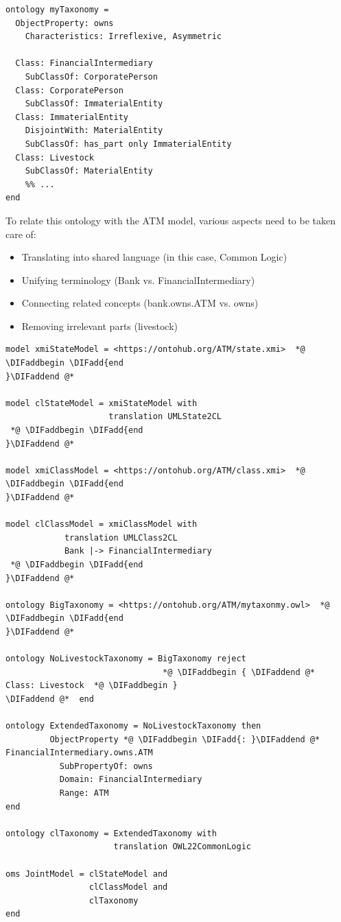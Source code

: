 \documentclass[10pt,fleqn,final]{scrreprt}
\providecommand{\DIFadd}[1]{{\protect\color{blue}\uwave{#1}}} %
\providecommand{\DIFaddbegin}{} %
\providecommand{\DIFaddend}{} %
\begin{document}
\begin{lstlisting}[basicstyle=\ttfamily,language=dolText,alsolanguage=owl2Manchester,escapechar=@,mathescape]
ontology myTaxonomy =
  ObjectProperty: owns
    Characteristics: Irreflexive, Asymmetric

  Class: FinancialIntermediary
    SubClassOf: CorporatePerson
  Class: CorporatePerson
    SubClassOf: ImmaterialEntity
  Class: ImmaterialEntity
    DisjointWith: MaterialEntity
    SubClassOf: has_part only ImmaterialEntity
  Class: Livestock
    SubClassOf: MaterialEntity
    %% ...
end
\end{lstlisting}

 To relate this ontology with the ATM model, 
various aspects need to be taken care of:
\begin{itemize}
  \item Translating into shared language  (in this case, Common Logic)
  \item Unifying terminology (Bank vs. FinancialIntermediary)
  \item Connecting related concepts (bank.owns.ATM vs. owns)
  \item Removing irrelevant parts (livestock) 
\end{itemize}

\begin{lstlisting}[basicstyle=\ttfamily\small,language=dolText,alsolanguage=owl2Manchester,escapechar=@,mathescape]
  model xmiStateModel = <https://ontohub.org/ATM/state.xmi>  *@ \DIFaddbegin \DIFadd{end
}\DIFaddend @*  

model clStateModel = xmiStateModel with
                     translation UMLState2CL
 *@ \DIFaddbegin \DIFadd{end
}\DIFaddend @*  

model xmiClassModel = <https://ontohub.org/ATM/class.xmi>  *@ \DIFaddbegin \DIFadd{end
}\DIFaddend @*  

model clClassModel = xmiClassModel with
            translation UMLClass2CL
            Bank |-> FinancialIntermediary
 *@ \DIFaddbegin \DIFadd{end
}\DIFaddend @*  

ontology BigTaxonomy = <https://ontohub.org/ATM/mytaxonmy.owl>  *@ \DIFaddbegin \DIFadd{end
}\DIFaddend @*  

ontology NoLivestockTaxonomy = BigTaxonomy reject
                                *@ \DIFaddbegin { \DIFaddend @*  Class: Livestock  *@ \DIFaddbegin }
\DIFaddend @*  end

ontology ExtendedTaxonomy = NoLivestockTaxonomy then
         ObjectProperty *@ \DIFaddbegin \DIFadd{: }\DIFaddend @*  FinancialIntermediary.owns.ATM
           SubPropertyOf: owns
           Domain: FinancialIntermediary
           Range: ATM
end

ontology clTaxonomy = ExtendedTaxonomy with
                      translation OWL22CommonLogic

oms JointModel = clStateModel and
                 clClassModel and
                 clTaxonomy
end
\end{lstlisting}
\end{document}
